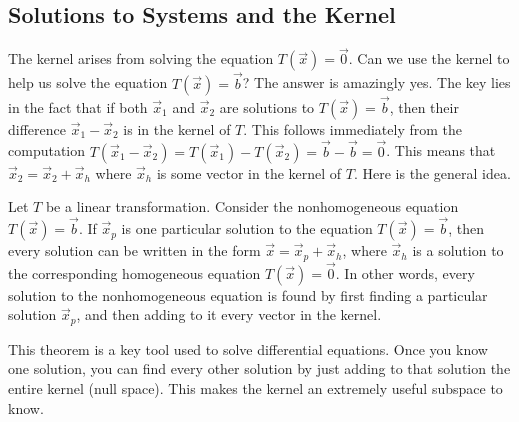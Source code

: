 
\subsection{Solutions to Systems and the Kernel}

The kernel arises from solving the equation $T(\vec x)=\vec 0$.  Can we use the kernel to help us solve the equation $T(\vec x)=\vec b$?  The answer is amazingly yes. The key lies in the fact that if both $\vec x_1$ and $\vec x_2$ are solutions to $T(\vec x)=\vec b$, then their difference $\vec x_1-\vec x_2$ is in the kernel of $T$.  This follows immediately from the computation $T(\vec x_1-\vec x_2)=T(\vec x_1)-T(\vec x_2)=\vec b-\vec b=\vec 0$. This means that $\vec x_2=\vec x_2+\vec x_h$ where $\vec x_h$ is some vector in the kernel of $T$. Here is the general idea.
\begin{theorem}
Let $T$ be a linear transformation. Consider the nonhomogeneous equation $T(\vec x)=\vec b$.
If $\vec x_p$ is one particular solution to the equation $T(\vec x)=\vec b$, then every solution can be written in the form $\vec x = \vec x_p+\vec x_h$, where $\vec x_h$ is a solution to the corresponding homogeneous equation $T(\vec x)=\vec 0$.  In other words, every solution to the nonhomogeneous equation is found by first finding a particular solution $\vec x_p$, and then adding to it every vector in the kernel.  
\end{theorem} 
This theorem is a key tool used to solve differential equations.  Once you know one solution, you can find every other solution by just adding to that solution the entire kernel (null space). This makes the kernel an extremely useful subspace to know.

